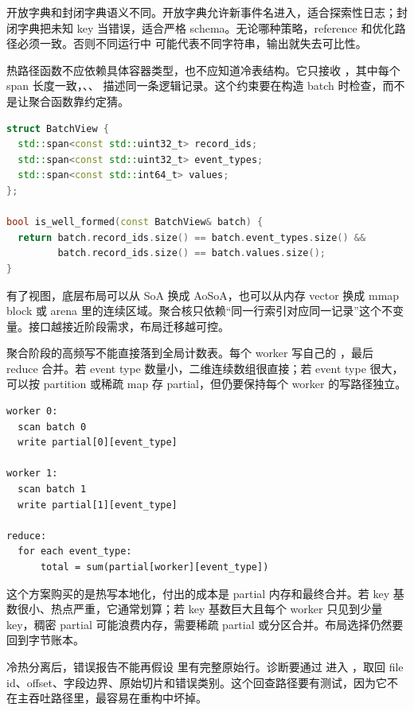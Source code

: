 开放字典和封闭字典语义不同。开放字典允许新事件名进入，适合探索性日志；封闭字典把未知 key 当错误，适合严格 schema。无论哪种策略，reference 和优化路径必须一致。否则不同运行中  可能代表不同字符串，输出就失去可比性。

热路径函数不应依赖具体容器类型，也不应知道冷表结构。它只接收 ，其中每个 span 长度一致，、、 描述同一条逻辑记录。这个约束要在构造 batch 时检查，而不是让聚合函数靠约定猜。

\begin{lstlisting}[language=C++,caption={BatchView 的不变量}]
struct BatchView {
  std::span<const std::uint32_t> record_ids;
  std::span<const std::uint32_t> event_types;
  std::span<const std::int64_t> values;
};

bool is_well_formed(const BatchView& batch) {
  return batch.record_ids.size() == batch.event_types.size() &&
         batch.record_ids.size() == batch.values.size();
}
\end{lstlisting}

有了视图，底层布局可以从 SoA 换成 AoSoA，也可以从内存 vector 换成 mmap block 或 arena 里的连续区域。聚合核只依赖“同一行索引对应同一记录”这个不变量。接口越接近阶段需求，布局迁移越可控。

聚合阶段的高频写不能直接落到全局计数表。每个 worker 写自己的 ，最后 reduce 合并。若 event type 数量小，二维连续数组很直接；若 event type 很大，可以按 partition 或稀疏 map 存 partial，但仍要保持每个 worker 的写路径独立。

\begin{lstlisting}[numbers=none,caption={worker-local partial 的执行账本}]
worker 0:
  scan batch 0
  write partial[0][event_type]

worker 1:
  scan batch 1
  write partial[1][event_type]

reduce:
  for each event_type:
      total = sum(partial[worker][event_type])
\end{lstlisting}

这个方案购买的是热写本地化，付出的成本是 partial 内存和最终合并。若 key 基数很小、热点严重，它通常划算；若 key 基数巨大且每个 worker 只见到少量 key，稠密 partial 可能浪费内存，需要稀疏 partial 或分区合并。布局选择仍然要回到字节账本。

冷热分离后，错误报告不能再假设  里有完整原始行。诊断要通过  进入 ，取回 file id、offset、字段边界、原始切片和错误类别。这个回查路径要有测试，因为它不在主吞吐路径里，最容易在重构中坏掉。

